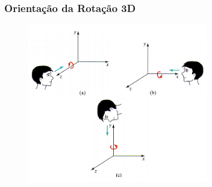 \documentclass{beamer}
\begin{document}
\begin{frame}
\frametitle{Orientação da Rotação 3D}

	\begin{figure}[!h]
			\begin{center}
			\includegraphics[width=0.7\textwidth]{Figures/OriRotacao}
			\end{center}
	\end{figure}
	
\end{frame}
\end{document}
